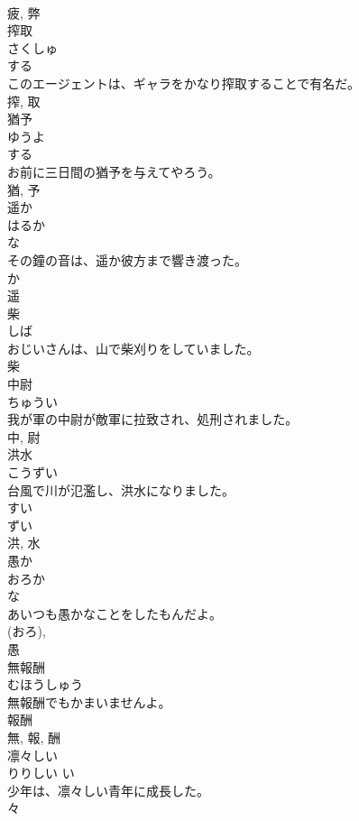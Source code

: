 \documentclass[8pt]{extreport}
\begin{document}
\begin{CJK}{UTF8}{min}
\\	疲, 弊	
\\	搾取	
\\	さくしゅ	
\\	する 
\\	このエージェントは、ギャラをかなり搾取することで有名だ。	
\\	搾, 取	
\\	猶予	
\\	ゆうよ	
\\	する 
\\	お前に三日間の猶予を与えてやろう。	
\\	猶, 予	
\\	遥か	
\\	はるか	
\\	な 
\\	その鐘の音は、遥か彼方まで響き渡った。	
\\	か 
\\	遥	
\\	柴	
\\	しば	
\\	おじいさんは、山で柴刈りをしていました。	
\\	柴	
\\	中尉	
\\	ちゅうい	
\\	我が軍の中尉が敵軍に拉致され、処刑されました。	
\\	中, 尉	
\\	洪水	
\\	こうずい	
\\	台風で川が氾濫し、洪水になりました。	
\\	すい 
\\	ずい 
\\	洪, 水	
\\	愚か	
\\	おろか	
\\	な 
\\	あいつも愚かなことをしたもんだよ。	
\\	(おろ), 
\\	愚	
\\	無報酬	
\\	むほうしゅう	
\\	無報酬でもかまいませんよ。	
\\	報酬 
\\	無, 報, 酬	
\\	凛々しい	
\\	りりしい	い 
\\	少年は、凛々しい青年に成長した。	
\\	々 

\end{CJK}
\end{document}
